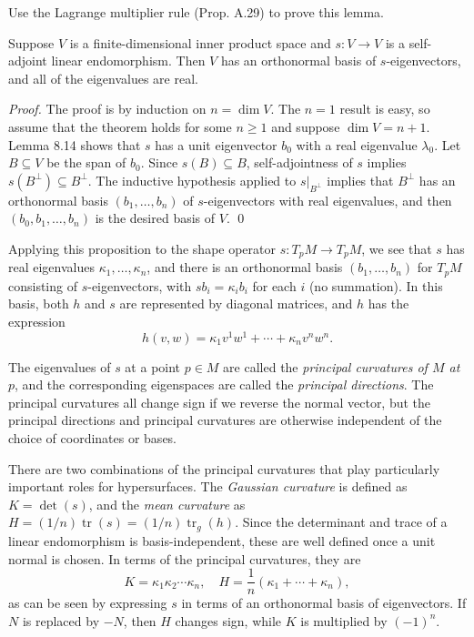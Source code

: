 \begin{exercise}
\label{exer:lagrange-multiplier-eigenvector}
Use the Lagrange multiplier rule (Prop. A.29) to prove this lemma.
\end{exercise}

\begin{proposition}
\label{prop:finite-dimensional-spectral-theorem}
Suppose $V$ is a finite-dimensional inner product space and $s: V \to V$ is a self-adjoint linear endomorphism. Then $V$ has an orthonormal basis of $s$-eigenvectors, and all of the eigenvalues are real.
\end{proposition}

\begin{proof}
The proof is by induction on $n = \dim V$. The $n = 1$ result is easy, so assume that the theorem holds for some $n \geq 1$ and suppose $\dim V = n + 1$. Lemma 8.14 shows that $s$ has a unit eigenvector $b_0$ with a real eigenvalue $\lambda_0$. Let $B \subseteq V$ be the span of $b_0$. Since $s(B) \subseteq B$, self-adjointness of $s$ implies $s(B^\perp) \subseteq B^\perp$. The inductive hypothesis applied to $s|_{B^\perp}$ implies that $B^\perp$ has an orthonormal basis $(b_1, \ldots, b_n)$ of $s$-eigenvectors with real eigenvalues, and then $(b_0, b_1, \ldots, b_n)$ is the desired basis of $V$. \qed
\end{proof}

Applying this proposition to the shape operator $s: T_p M \to T_p M$, we see that $s$ has real eigenvalues $\kappa_1, \ldots, \kappa_n$, and there is an orthonormal basis $(b_1, \ldots, b_n)$ for $T_p M$ consisting of $s$-eigenvectors, with $sb_i = \kappa_i b_i$ for each $i$ (no summation). In this basis, both $h$ and $s$ are represented by diagonal matrices, and $h$ has the expression
\[
h(v,w) = \kappa_1 v^1 w^1 + \cdots + \kappa_n v^n w^n.
\]

The eigenvalues of $s$ at a point $p \in M$ are called the \emph{principal curvatures of $M$ at $p$}, and the corresponding eigenspaces are called the \emph{principal directions}. The principal curvatures all change sign if we reverse the normal vector, but the principal directions and principal curvatures are otherwise independent of the choice of coordinates or bases.

There are two combinations of the principal curvatures that play particularly important roles for hypersurfaces. The \emph{Gaussian curvature} is defined as $K = \det(s)$, and the \emph{mean curvature} as $H = (1/n) \operatorname{tr}(s) = (1/n) \operatorname{tr}_g(h)$. Since the determinant and trace of a linear endomorphism is basis-independent, these are well defined once a unit normal is chosen. In terms of the principal curvatures, they are
\[
K = \kappa_1 \kappa_2 \cdots \kappa_n, \quad H = \frac{1}{n}(\kappa_1 + \cdots + \kappa_n),
\]
as can be seen by expressing $s$ in terms of an orthonormal basis of eigenvectors. If $N$ is replaced by $-N$, then $H$ changes sign, while $K$ is multiplied by $(-1)^n$.

